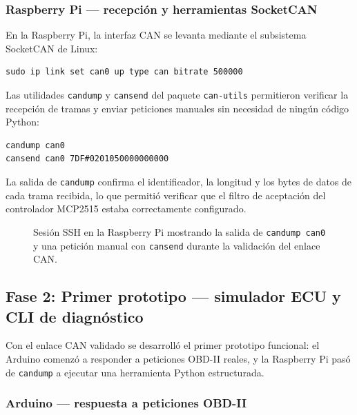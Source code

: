 \subsubsection*{Raspberry Pi — recepción y herramientas SocketCAN}

En la Raspberry Pi, la interfaz CAN se levanta mediante el subsistema SocketCAN de Linux:

\begin{verbatim}
sudo ip link set can0 up type can bitrate 500000
\end{verbatim}

Las utilidades \texttt{candump} y \texttt{cansend} del paquete \texttt{can-utils} permitieron verificar la recepción de tramas y enviar peticiones manuales sin necesidad de ningún código Python:

\begin{verbatim}
candump can0
cansend can0 7DF#0201050000000000
\end{verbatim}

La salida de \texttt{candump} confirma el identificador, la longitud y los bytes de datos de cada trama recibida, lo que permitió verificar que el filtro de aceptación del controlador MCP2515 estaba correctamente configurado.

\begin{figure}[!htbp]
\centering
\caption{Sesión SSH en la Raspberry Pi mostrando la salida de \texttt{candump can0} y una petición manual con \texttt{cansend} durante la validación del enlace CAN.}
\label{fig:fase1_pi_candump}
\end{figure}


\subsection{Fase 2: Primer prototipo — simulador ECU y CLI de diagnóstico}
\label{sec:fase2}

Con el enlace CAN validado se desarrolló el primer prototipo funcional: el Arduino comenzó a responder a peticiones OBD-II reales, y la Raspberry Pi pasó de \texttt{candump} a ejecutar una herramienta Python estructurada.

\subsubsection*{Arduino — respuesta a peticiones OBD-II}

